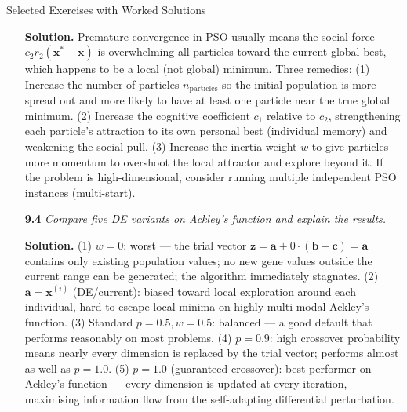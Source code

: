 \documentclass[aspectratio=169,10pt]{beamer}
\newcommand{\bx}{\mathbf{x}}
\newcommand{\ba}{\mathbf{a}}
\newcommand{\bb}{\mathbf{b}}
\newcommand{\bc}{\mathbf{c}}
\begin{document}
\begin{frame}[allowframebreaks]{Selected Exercises with Worked Solutions}
\begin{enumerate}
      \textbf{Solution.}  Premature convergence in PSO usually means
      the social force $c_2 r_2 (\bx^* - \bx)$ is overwhelming all
      particles toward the current global best, which happens to be
      a local (not global) minimum.  Three remedies:
      (1) Increase the number of particles $n_{\text{particles}}$
      so the initial population is more spread out and more likely
      to have at least one particle near the true global minimum.
      (2) Increase the cognitive coefficient $c_1$ relative to $c_2$,
      strengthening each particle's attraction to its own personal
      best (individual memory) and weakening the social pull.
      (3) Increase the inertia weight $w$ to give particles more
      momentum to overshoot the local attractor and explore beyond
      it.  If the problem is high-dimensional, consider running
      multiple independent PSO instances (multi-start).

    \item[\textbf{9.4}] \textit{Compare five DE variants on Ackley's
      function and explain the results.}

      \textbf{Solution.}
      (1) $w = 0$: worst --- the trial vector $\mathbf{z} = \ba +
      0 \cdot (\bb - \bc) = \ba$ contains only existing population
      values; no new gene values outside the current range can be
      generated; the algorithm immediately stagnates.
      (2) $\ba = \bx^{(i)}$ (DE/current): biased toward local
      exploration around each individual, hard to escape local
      minima on highly multi-modal Ackley's function.
      (3) Standard $p = 0.5, w = 0.5$: balanced --- a good default
      that performs reasonably on most problems.
      (4) $p = 0.9$: high crossover probability means nearly every
      dimension is replaced by the trial vector; performs almost as
      well as $p = 1.0$.
      (5) $p = 1.0$ (guaranteed crossover): best performer on
      Ackley's function --- every dimension is updated at every
      iteration, maximising information flow from the self-adapting
      differential perturbation.
  \end{enumerate}

\end{frame}
\end{document}
